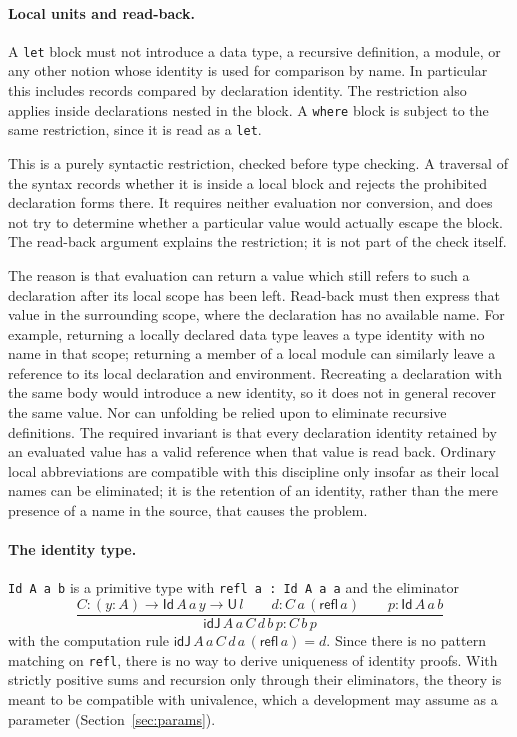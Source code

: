 \documentclass[11pt]{article}
\newcommand{\kw}[1]{\texttt{#1}}
\newcommand{\U}{\mathsf{U}}
\newcommand{\Id}{\mathsf{Id}}
\theoremstyle{remark}
\begin{document}
\paragraph{Local units and read-back.}\label{sec:local-units}
A \kw{let} block must not introduce a data type, a recursive definition,
a module, or any other notion whose identity is used for comparison by
name. In particular this includes records compared by declaration
identity. The restriction also applies inside declarations nested in
the block. A \kw{where} block is subject to the same restriction, since
it is read as a \kw{let}.

This is a purely syntactic restriction, checked before type checking.
A traversal of the syntax records whether it is inside a local block
and rejects the prohibited declaration forms there. It requires neither
evaluation nor conversion, and does not try to determine whether a
particular value would actually escape the block. The read-back argument
explains the restriction; it is not part of the check itself.

The reason is that evaluation can return a value which still refers to
such a declaration after its local scope has been left. Read-back must
then express that value in the surrounding scope, where the declaration
has no available name. For example, returning a locally declared data
type leaves a type identity with no name in that scope; returning a
member of a local module can similarly leave a reference to its local
declaration and environment. Recreating a declaration with the same body
would introduce a new identity, so it does not in general recover the
same value. Nor can unfolding be relied upon to eliminate recursive
definitions. The required invariant is that every declaration identity
retained by an evaluated value has a valid reference when that value is
read back. Ordinary local abbreviations are compatible with this
discipline only insofar as their local names can be eliminated; it is
the retention of an identity, rather than the mere presence of a name
in the source, that causes the problem.

\paragraph{The identity type.} \kw{Id A a b} is a primitive type with
\kw{refl a : Id A a a} and the eliminator
\[
\frac{C : (y:A)\to\Id\,A\,a\,y\to\U\,l\qquad d : C\,a\,(\mathsf{refl}\,a)\qquad p:\Id\,A\,a\,b}
     {\mathsf{idJ}\,A\,a\,C\,d\,b\,p : C\,b\,p}
\]
with the computation rule $\mathsf{idJ}\,A\,a\,C\,d\,a\,(\mathsf{refl}\,a)=d$.
Since there is no pattern matching on \kw{refl}, there is no way to derive
uniqueness of identity proofs. With strictly positive sums and recursion
only through their eliminators, the theory is meant to be compatible with
univalence, which a development may assume as a parameter
(Section~\ref{sec:params}).
\end{document}

